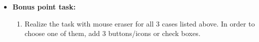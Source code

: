 \begin{itemize}
\item \textbf{Bonus point task:}
      \begin{enumerate}
    \item Realize the task with mouse eraser for all 3 cases listed above. In order to choose one of them, add 3 buttons/icons or check boxes.
    	\end{enumerate}
    	
  \end{itemize}  

\clearpage